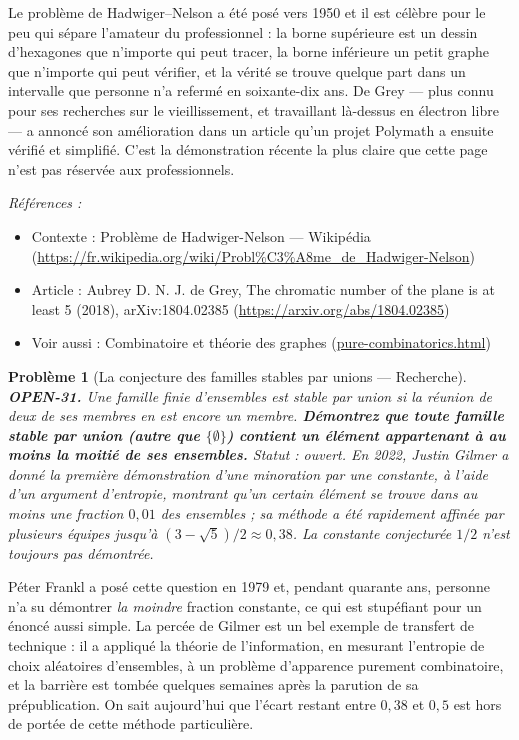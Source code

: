 \documentclass[11pt]{article}
\newtheorem{problem}{Problème}
\newenvironment{refs}{\par\small\noindent\emph{Références :}\begin{itemize}\setlength\itemsep{0pt}}{\end{itemize}\normalsize}
\begin{document}
\noindent Le problème de Hadwiger--Nelson a été posé vers 1950 et il est célèbre
pour le peu qui sépare l'amateur du professionnel : la borne supérieure est un dessin
d'hexagones que n'importe qui peut tracer, la borne inférieure un petit graphe que
n'importe qui peut vérifier, et la vérité se trouve quelque part dans un intervalle que
personne n'a refermé en soixante-dix ans. De Grey --- plus connu pour ses recherches sur le
vieillissement, et travaillant là-dessus en électron libre --- a annoncé son amélioration
dans un article qu'un projet Polymath a ensuite vérifié et simplifié. C'est la
démonstration récente la plus claire que cette page n'est pas réservée aux
professionnels.

\begin{refs}
\item Contexte : Problème de Hadwiger-Nelson --- Wikipédia (\url{https://fr.wikipedia.org/wiki/Probl%C3%A8me_de_Hadwiger-Nelson})
\item Article : Aubrey D. N. J. de Grey, \og{} The chromatic number of the plane is at least 5 \fg{} (2018), arXiv:1804.02385 (\url{https://arxiv.org/abs/1804.02385})
\item Voir aussi : Combinatoire et théorie des graphes (\url{pure-combinatorics.html})
\end{refs}

\bigskip

\begin{problem}[{La conjecture des familles stables par unions --- Recherche}]
\textbf{OPEN-31.} Une famille finie d'ensembles est \textit{stable par
union} si la réunion de deux de ses membres en est encore un membre. \textbf{Démontrez que
toute famille stable par union (autre que $ \{\emptyset\} $) contient un élément
appartenant à au moins la moitié de ses ensembles.} Statut : ouvert. En 2022, Justin
Gilmer a donné la première démonstration d'une minoration par une constante, à l'aide d'un
argument d'entropie, montrant qu'un certain élément se trouve dans au moins une fraction
$ 0{,}01 $ des ensembles ; sa méthode a été rapidement affinée par plusieurs équipes
jusqu'à $ (3-\sqrt5)/2 \approx 0{,}38 $. La constante conjecturée $ 1/2 $ n'est
toujours pas démontrée.
\end{problem}

\noindent Péter Frankl a posé cette question en 1979 et, pendant quarante ans,
personne n'a su démontrer \textit{la moindre} fraction constante, ce qui est stupéfiant pour
un énoncé aussi simple. La percée de Gilmer est un bel exemple de transfert de technique :
il a appliqué la théorie de l'information, en mesurant l'entropie de choix aléatoires
d'ensembles, à un problème d'apparence purement combinatoire, et la barrière est tombée
quelques semaines après la parution de sa prépublication. On sait aujourd'hui que l'écart
restant entre $ 0{,}38 $ et $ 0{,}5 $ est hors de portée de cette méthode particulière.
\end{document}
